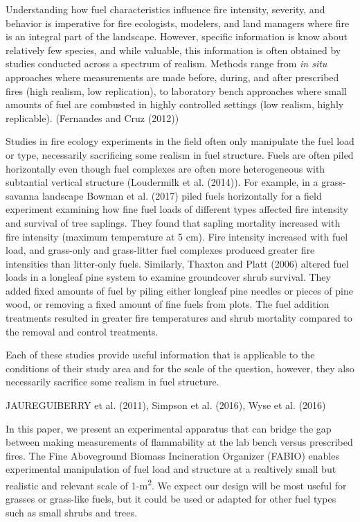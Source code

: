\documentclass[11pt,a4paper]{article}
\begin{document}
Understanding how fuel characteristics influence fire intensity,
severity, and behavior is imperative for fire ecologists, modelers, and
land managers where fire is an integral part of the landscape. However,
specific information is know about relatively few species, and while
valuable, this information is often obtained by studies conducted across
a spectrum of realism. Methods range from \emph{in situ} approaches
where measurements are made before, during, and after prescribed fires
(high realism, low replication), to laboratory bench approaches where
small amounts of fuel are combusted in highly controlled settings (low
realism, highly replicable). (Fernandes and Cruz (2012))

Studies in fire ecology experiments in the field often only manipulate
the fuel load or type, necessarily sacrificing some realism in fuel
structure. Fuels are often piled horizontally even though fuel complexes
are often more heterogeneous with subtantial vertical structure
(Loudermilk et al. (2014)). For example, in a grass-savanna landscape
Bowman et al. (2017) piled fuels horizontally for a field experiment
examining how fine fuel loads of different types affected fire intensity
and survival of tree saplings. They found that sapling mortality
increased with fire intensity (maximum temperature at 5 cm). Fire
intensity increased with fuel load, and grass-only and grass-litter fuel
complexes produced greater fire intensities than litter-only fuels.
Similarly, Thaxton and Platt (2006) altered fuel loads in a longleaf
pine system to examine groundcover shrub survival. They added fixed
amounts of fuel by piling either longleaf pine needles or pieces of pine
wood, or removing a fixed amount of fine fuels from plots. The fuel
addition treatments resulted in greater fire temperatures and shrub
mortality compared to the removal and control treatments.

Each of these studies provide useful information that is applicable to
the conditions of their study area and for the scale of the question,
however, they also necessarily sacrifice some realism in fuel structure.

JAUREGUIBERRY et al. (2011), Simpson et al. (2016), Wyse et al. (2016)

In this paper, we present an experimental apparatus that can bridge the
gap between making measurements of flammability at the lab bench versus
prescribed fires. The Fine Aboveground Biomass Incineration Organizer
(FABIO) enables experimental manipulation of fuel load and structure at
a realtively small but realistic and relevant scale of
1-m\textsuperscript{2}. We expect our design will be most useful for
grasses or grass-like fuels, but it could be used or adapted for other
fuel types such as small shrubs and trees.
\end{document}

